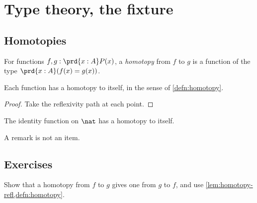 \chapter{Type theory, the fixture}

\section{Homotopies}
\label{sec:homotopy}

\begin{defn}\label{defn:homotopy}
For functions $f,g:\prd{x:A}P(x)$, a \emph{homotopy} from $f$ to $g$ is a
function of the type $\prd{x:A}(f(x)=g(x))$.
\end{defn}

\begin{lem}\label{lem:homotopy-refl}
Each function has a homotopy to itself, in the sense of \cref{defn:homotopy}.
\end{lem}
\begin{proof}
Take the reflexivity path at each point.
\end{proof}

\begin{eg}
The identity function on $\nat$ has a homotopy to itself.
\end{eg}

\begin{rmk}
A remark is not an item.
\end{rmk}

\section*{Exercises}

\begin{ex}\label{ex:homotopy-sym}
Show that a homotopy from $f$ to $g$ gives one from $g$ to $f$, and use
\cref{lem:homotopy-refl,defn:homotopy}.
\end{ex}

\begin{example}\label{eg:later}
\end{example}
